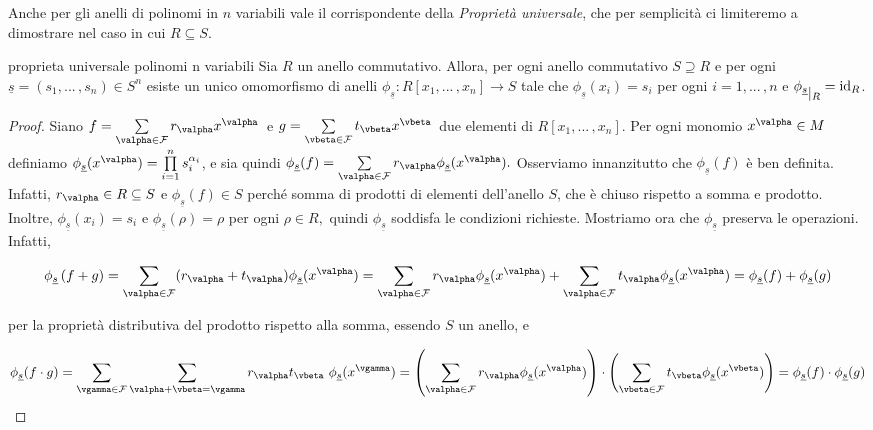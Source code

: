 \noindent Anche per gli anelli di polinomi in $n$ variabili vale il corrispondente della \emph{Proprietà universale}, 
che per semplicità ci limiteremo a dimostrare nel caso in cui $R\subseteq S$.

\begin{teo}{proprieta universale polinomi n variabili}
  Sia $R$ un anello commutativo. Allora, per ogni anello commutativo $S\supseteq R$ e per ogni $\underline{s}=(s_1,...\,,s_n)\in S^n$ esiste un unico omomorfismo di anelli $\phi_{\underline{s}}\colon R[x_1, ...\, ,x_n]\to S$ tale che $\phi_{\underline{s}} (x_i)=s_i$ per ogni $i=1,...\,,n$ e $\phi_{\underline{s}} \raisebox{-.5em}{$\vert_{R}$}= \operatorname{id}_R$.
\end{teo}
\vspace{-3.5mm}
\begin{proof}
  Siano $f=\sum\limits_{\valpha\in \mathcal{F}} r_{\valpha}x^{\valpha}\,$ e $g=\sum\limits_{\vbeta\in \mathcal{F}} t_{\vbeta}x^{\vbeta}\,$ 
  due elementi di $R[x_1,...\,,x_n].$ Per ogni monomio $x^{\valpha}\in M$ definiamo 
  $\phi_{\underline{s}}(x^{\valpha})=\prod\limits_{i=1}^n s_i^{\alpha_i}$, e sia quindi 
  $\phi_{\underline{s}}(f)=\sum\limits_{\valpha\in \mathcal{F}} r_{\valpha}\phi_{\underline{s}}(x^{\valpha}).$ 
  Osserviamo innanzitutto che $\phi_{\underline{s}}(f)$ è ben definita. Infatti, 
  $r_{\valpha}\in R\subseteq S$ e $\phi_{\underline{s}}(f)\in S$ perché somma di prodotti di elementi dell'anello $S$, 
  che è chiuso rispetto a somma e prodotto. Inoltre, $\phi_{\underline{s}}(x_i)=s_i$ e 
  $\phi_{\underline{s}}(\rho)=\rho$ per ogni $\rho\in R,$ quindi $\phi_{\underline{s}}$ soddisfa le condizioni richieste. 
  Mostriamo ora che $\phi_{\underline{s}}$ preserva le operazioni. Infatti, 
  
  $$\phi_{\underline{s}}\left(f+g\right)=\sum\limits_{\valpha\in \mathcal{F}}(r_{\valpha}+t_{\valpha}) 
  \phi_{\underline{s}}(x^{\valpha})=\sum\limits_{\valpha\in \mathcal{F}}r_{\valpha}\phi_{\underline{s}}(x^{\valpha})+
  \sum\limits_{\valpha\in \mathcal{F}}t_{\valpha} \phi_{\underline{s}}(x^{\valpha})=\phi_{\underline{s}}(f)+\phi_{\underline{s}}(g)$$ 
  
  \noindent per la proprietà distributiva del prodotto rispetto alla somma, essendo $S$ un anello, e 
  
  $$\phi_{\underline{s}}(f\cdot g)=\sum\limits_{\vgamma\in \mathcal{F}} \sum\limits_{\valpha+\vbeta=\vgamma} r_{\valpha}t_{\vbeta} \ 
  \phi_{\underline{s}}(x^{\vgamma})=\left(\sum\limits_{\valpha\in \mathcal{F}} r_{\valpha}\phi_{\underline{s}}(x^{\valpha})\right)\cdot 
  \left(\sum\limits_{\vbeta\in \mathcal{F}} t_{\vbeta}\phi_{\underline{s}}(x^{\vbeta})\right)=\phi_{\underline{s}}(f)\cdot \phi_{\underline{s}}(g)$$ 
  

\end{proof}
